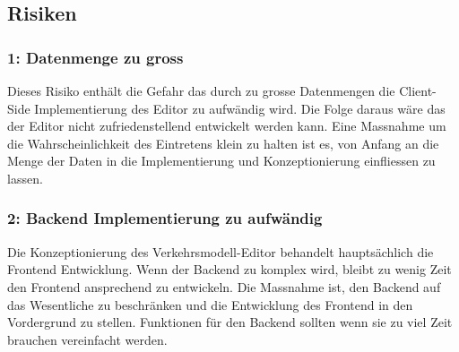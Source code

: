\subsection{Risiken}
\subsubsection*{1: Datenmenge zu gross}
\begin{flushleft}
Dieses Risiko enthält die Gefahr das durch zu grosse Datenmengen die Client-Side Implementierung des Editor zu aufwändig wird. Die Folge daraus wäre das der Editor nicht zufriedenstellend entwickelt werden kann. Eine Massnahme um die Wahrscheinlichkeit des Eintretens klein zu halten ist es, von Anfang an die Menge der Daten in die Implementierung und Konzeptionierung einfliessen zu lassen.\\[0.2cm]
\subsubsection*{2: Backend Implementierung zu aufwändig}
Die Konzeptionierung des Verkehrsmodell-Editor behandelt hauptsächlich die Frontend Entwicklung. Wenn der Backend zu komplex wird, bleibt zu wenig Zeit den Frontend ansprechend zu entwickeln. Die Massnahme ist, den Backend auf das Wesentliche zu beschränken und die Entwicklung des Frontend in den Vordergrund zu stellen. Funktionen für den Backend sollten wenn sie zu viel Zeit brauchen vereinfacht werden.\\

\end{flushleft}

